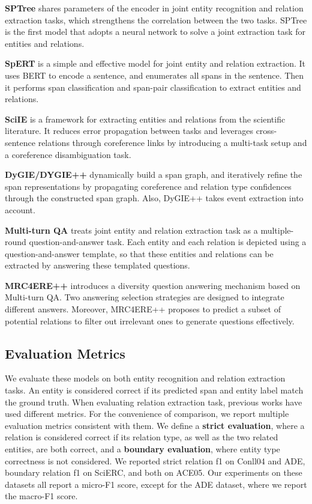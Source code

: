 \documentclass[sigconf]{acmart}
\begin{document}
\noindent \textbf{SPTree} \cite{miwa2016end}
shares parameters of the encoder in joint entity recognition and relation extraction tasks, which strengthens the correlation between the two tasks. SPTree is the first model that adopts a neural network to solve a joint extraction task for entities and relations.

\noindent \textbf{SpERT} \cite{eberts2019span} is a simple and effective model for joint entity and relation extraction. It uses BERT \cite{devlin2018bert} to encode a sentence, and enumerates all spans in the sentence. Then it performs span classification and span-pair classification to extract entities and relations.

\noindent \textbf{SciIE} \cite{luan2018multi}
is a framework for extracting entities and relations from the scientific literature. It reduces error propagation between tasks and leverages cross-sentence relations through coreference links by introducing a multi-task setup and a coreference disambiguation task.

\noindent \textbf{DyGIE/DYGIE++} \cite{luan2019general, wadden2019entity}
dynamically build a span graph, and iteratively refine the span representations by propagating coreference and relation type confidences through the constructed span graph. Also, DyGIE++ takes event extraction into account.

\noindent \textbf{Multi-turn QA} \cite{li2019entity}
treats joint entity and relation extraction task as a multiple-round question-and-answer task. Each entity and each relation is depicted using a question-and-answer template, so that these entities and relations can be extracted by answering these templated questions.

\noindent \textbf{MRC4ERE++} \cite{zhaoasking} introduces a diversity question answering mechanism based on Multi-turn QA. Two answering selection strategies are designed to integrate different answers. Moreover, MRC4ERE++ proposes to predict a subset of potential relations to filter out irrelevant ones to generate questions effectively.

\subsection{Evaluation Metrics}
We evaluate these models on both entity recognition and relation extraction tasks. An entity is considered correct if its predicted span and entity label match the ground truth.
When evaluating relation extraction task, previous works have used different metrics. For the convenience of comparison, we report multiple evaluation metrics consistent with them. We define a \textbf{strict evaluation}, where a relation is considered correct if its relation type, as well as the two related entities, are both correct, and a \textbf{boundary evaluation}, where entity type correctness is not considered. We reported strict relation f1 on Conll04 and ADE, boundary relation f1 on SciERC, and both on ACE05. Our experiments on these datasets all report a micro-F1 score, except for the ADE dataset, where we report the macro-F1 score.
\end{document}
